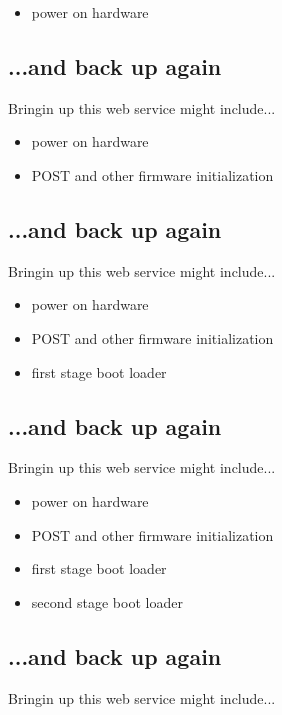 \documentclass[xga]{xdvislides}
\begin{document}
\begin{itemize}
	\item power on hardware
\end{itemize}

\subsection{...and back up again}
Bringin up this web service might include...
\\

\begin{itemize}
	\item power on hardware
	\item POST and other firmware initialization
\end{itemize}

\subsection{...and back up again}
Bringin up this web service might include...
\\

\begin{itemize}
	\item power on hardware
	\item POST and other firmware initialization
	\item first stage boot loader
\end{itemize}

\subsection{...and back up again}
Bringin up this web service might include...
\\

\begin{itemize}
	\item power on hardware
	\item POST and other firmware initialization
	\item first stage boot loader
	\item second stage boot loader
\end{itemize}

\subsection{...and back up again}
Bringin up this web service might include...
\\
\end{document}
